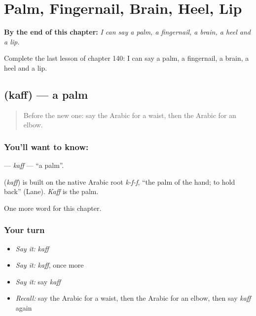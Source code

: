 
\chapter{Palm, Fingernail, Brain, Heel, Lip}
\label{ch:ar-palm-fingernail-brain-heel-lip}

\begin{chapteropening}
\textbf{By the end of this chapter:} \emph{I can say a palm, a fingernail, a brain, a heel and a lip.}

Complete the last lesson of chapter 140: I can say a palm, a fingernail, a brain, a heel and a lip.
\end{chapteropening}

\section[\texorpdfstring{\ar{كف} (kaff)}{كف (kaff)}]{ (kaff) — a palm}

\label{lesson:AR-C140-kaff}



\begin{quote}
Before the new one: say the Arabic for a waist, then the Arabic for an elbow.
\end{quote}

\subsection*{You'll want to know: }
\textbf{} — \emph{kaff} — \textquotedblleft{}a palm\textquotedblright{}.

\begin{cousinweb}
\textbf{} (\emph{kaff}) is built on the native Arabic root \emph{k-f-f}, \textquotedblleft{}the palm of the hand; to hold back\textquotedblright{} (Lane). \emph{Kaff} is the palm.
\end{cousinweb}

\begin{grammarlens}[title={What you've built}]
One more word for this chapter.
\end{grammarlens}

\subsection*{Your turn}
\begin{itemize}
\raggedright
  \item \emph{Say it:} \emph{kaff}
  \item \emph{Say it:} \emph{kaff}, once more
  \item \emph{Say it:} say \emph{kaff}
  \item \emph{Recall:} say the Arabic for a waist, then the Arabic for an elbow, then say \emph{kaff} again
\end{itemize}

